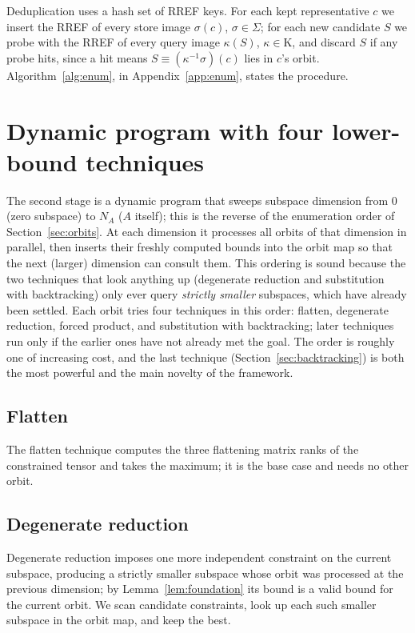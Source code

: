 \documentclass[11pt]{article}
\theoremstyle{definition}
\newcommand{\Kappa}{\mathrm{K}}
\begin{document}
Deduplication uses a hash set of RREF keys.
For each kept representative $c$ we insert the RREF of every store image
$\sigma(c)$, $\sigma\in\Sigma$; for each new candidate $S$ we probe with
the RREF of every query image $\kappa(S)$, $\kappa\in\Kappa$, and
discard $S$ if any probe hits, since a hit means $S\equiv (\kappa^{-1}\sigma)(c)$
lies in $c$'s orbit.
Algorithm~\ref{alg:enum}, in Appendix~\ref{app:enum}, states the procedure.

\section{Dynamic program with four lower-bound techniques}\label{sec:techniques}

The second stage is a dynamic program that sweeps subspace
dimension from $0$ (zero subspace) to $N_A$ ($A$ itself); this is the reverse of
the enumeration order of Section~\ref{sec:orbits}. At
each dimension it processes all orbits of that
dimension in parallel, then inserts their freshly computed bounds into the orbit
map so that the next (larger) dimension can consult them. This ordering is sound
because the two techniques that look anything up (degenerate reduction and
substitution with backtracking) only ever query \emph{strictly smaller}
subspaces, which have already been settled. Each orbit tries four techniques in
this order: flatten, degenerate reduction, forced product, and substitution with
backtracking; later techniques run only if the earlier ones have not already met
the goal. The order is roughly one of increasing cost, and the last technique
(Section~\ref{sec:backtracking}) is both the most powerful and the main novelty
of the framework.

\subsection{Flatten}\label{sec:flatten}

The flatten technique computes the three flattening matrix ranks of the
constrained tensor and takes the maximum; it is the base case and needs no other
orbit.

\subsection{Degenerate reduction}\label{sec:degenerate}

Degenerate reduction imposes one more independent constraint on the current
subspace, producing a strictly smaller subspace whose orbit was processed
at the previous dimension; by Lemma~\ref{lem:foundation} its bound is a
valid bound for the current orbit. We scan candidate constraints, look up each
such smaller subspace in the orbit map, and keep the best.
\end{document}
